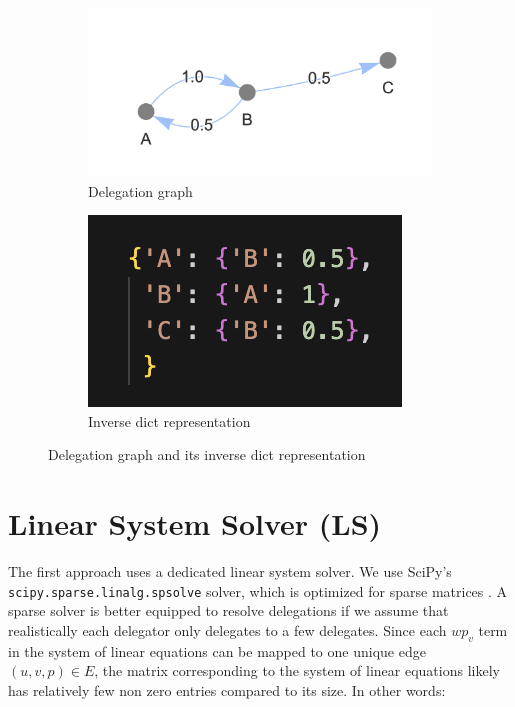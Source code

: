 \begin{figure}[t]
    \centering
    \begin{subfigure}[t]{0.45\textwidth}
        \centering
        \includegraphics[width=\textwidth]{small_cycle_graph}
        \caption{Delegation graph}
    \end{subfigure}
    \hfill
    \begin{subfigure}[t]{0.45\textwidth}
        \centering
        \includegraphics[width=\textwidth]{small_cycle_graph_inverse_dict}
        \caption{Inverse dict representation}
    \end{subfigure}
    \caption{Delegation graph and its inverse dict representation}
    \label{fig:inverse_dict_example}
\end{figure}

\section{Linear System Solver (LS)}

The first approach uses a dedicated linear system solver. We use SciPy's \texttt{scipy.sparse.linalg.spsolve} solver, which is optimized for sparse matrices \cite{virtanenSciPy10Fundamental2020}. A sparse solver is better equipped to resolve delegations if we assume that realistically each delegator only delegates to a few delegates. Since each $wp_v$ term in the system of linear equations can be mapped to one unique edge $(u, v, p) \in E$, the matrix corresponding to the system of linear equations likely has relatively few non zero entries compared to its size. In other words:

